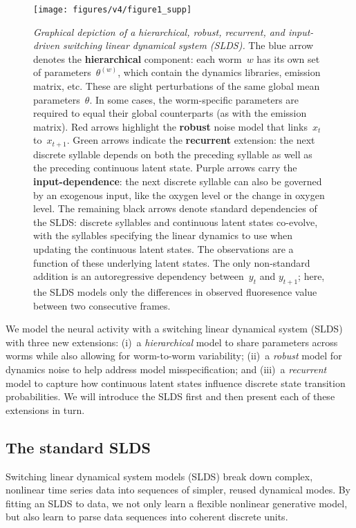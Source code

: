 \documentclass[11pt]{article}
\begin{document}
\begin{figure}[t!]
\centering%
\texttt{[image: figures/v4/figure1\_supp]} 
\caption{\textit{Graphical depiction of a hierarchical, robust,
    recurrent, and input-driven switching linear dynamical system
    (SLDS).}  The blue arrow denotes the \textbf{hierarchical}
  component: each worm~$w$ has its own set of
  parameters~$\theta^{(w)}$, which contain the dynamics libraries,
  emission matrix, etc. These are slight perturbations of the same
  global mean parameters~$\theta$.  In some cases, the worm-specific
  parameters are required to equal their global counterparts (as with
  the emission matrix).  Red arrows highlight the \textbf{robust}
  noise model that links~$x_t$ to~$x_{t+1}$.  Green arrows indicate
  the \textbf{recurrent} extension: the next discrete syllable depends
  on both the preceding syllable as well as the preceding continuous
  latent state.  Purple arrows carry the \textbf{input-dependence}:
  the next discrete syllable can also be governed by an exogenous
  input, like the oxygen level or the change in oxygen level. The
  remaining black arrows denote standard dependencies of the SLDS:
  discrete syllables and continuous latent states co-evolve, with the
  syllables specifying the linear dynamics to use when updating the
  continuous latent states.  The observations are a function of these
  underlying latent states.  The only non-standard addition is an
  autoregressive dependency between~$y_t$ and $y_{t+1}$; here, the
  SLDS models only the differences in observed fluoresence value
  between two consecutive frames.  }
\label{fig:graphical_model}
\end{figure}

We model the neural activity with a switching linear dynamical system
(SLDS) with three new extensions: (i)~a \emph{hierarchical} model to
share parameters across worms while also allowing for worm-to-worm
variability; (ii)~a \emph{robust} model for dynamics noise to help
address model misspecification; and (iii)~a \emph{recurrent} model to
capture how continuous latent states influence discrete state
transition probabilities.  We will introduce the SLDS first and then
present each of these extensions in turn.


\subsection{The standard SLDS}
Switching linear dynamical system models (SLDS) break down complex, nonlinear
time series data into sequences of simpler, reused dynamical modes.
By fitting an SLDS to data, we not only learn a flexible nonlinear generative
model, but also learn to parse data sequences into coherent discrete units.
\end{document}
